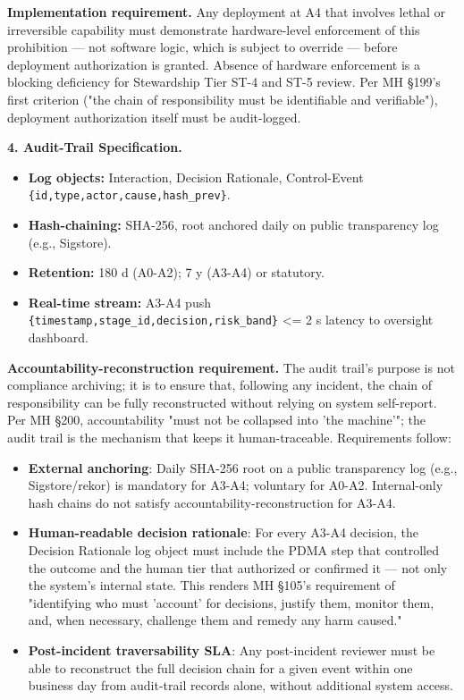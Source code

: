 \documentclass[11pt]{article}
\begin{document}
\textbf{Implementation requirement.} Any deployment at A4 that involves lethal or irreversible capability must demonstrate hardware-level enforcement of this prohibition — not software logic, which is subject to override — before deployment authorization is granted. Absence of hardware enforcement is a blocking deficiency for Stewardship Tier ST-4 and ST-5 review. Per MH §199's first criterion ("the chain of responsibility must be identifiable and verifiable"), deployment authorization itself must be audit-logged.


\textbf{4. Audit-Trail Specification.}


\begin{itemize}\setlength\itemsep{0pt}
\item \textbf{Log objects:} Interaction, Decision Rationale, Control-Event \texttt{\{id,type,actor,cause,hash\_prev\}}.
\item \textbf{Hash-chaining:} SHA-256, root anchored daily on public transparency log (e.g., Sigstore).
\item \textbf{Retention:} 180 d (A0-A2); 7 y (A3-A4) or statutory.
\item \textbf{Real-time stream:} A3-A4 push \texttt{\{timestamp,stage\_id,decision,risk\_band\}} <= 2 s latency to oversight dashboard.
\end{itemize}


\textbf{Accountability-reconstruction requirement.} The audit trail's purpose is not compliance archiving; it is to ensure that, following any incident, the chain of responsibility can be fully reconstructed without relying on system self-report. Per MH §200, accountability "must not be collapsed into 'the machine'"; the audit trail is the mechanism that keeps it human-traceable. Requirements follow:


\begin{itemize}\setlength\itemsep{0pt}
\item \textbf{External anchoring}: Daily SHA-256 root on a public transparency log (e.g., Sigstore/rekor) is mandatory for A3-A4; voluntary for A0-A2. Internal-only hash chains do not satisfy accountability-reconstruction for A3-A4.
\item \textbf{Human-readable decision rationale}: For every A3-A4 decision, the Decision Rationale log object must include the PDMA step that controlled the outcome and the human tier that authorized or confirmed it — not only the system's internal state. This renders MH §105's requirement of "identifying who must 'account' for decisions, justify them, monitor them, and, when necessary, challenge them and remedy any harm caused."
\item \textbf{Post-incident traversability SLA}: Any post-incident reviewer must be able to reconstruct the full decision chain for a given event within one business day from audit-trail records alone, without additional system access.
\end{itemize}
\end{document}
